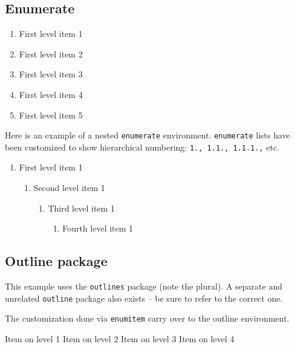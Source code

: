 \subsection{Enumerate}

    \begin{enumerate}
        \item First level item 1
        \item First level item 2
        \item First level item 3
        \item First level item 4
        \item First level item 5
    \end{enumerate}

    Here is an example of a nested \verb|enumerate| environment.
    \texttt{enumerate} lists have been customized to show hierarchical numbering:
    \texttt{1., 1.1., 1.1.1.,} etc.

    \begin{enumerate}
        \item First level item 1
        \begin{enumerate}
            \item Second level item 1
            \begin{enumerate}
                \item Third level item 1
                \begin{enumerate}
                    \item Fourth level item 1
                \end{enumerate}
            \end{enumerate}
        \end{enumerate}
    \end{enumerate}

\subsection{Outline package}

This example uses the \texttt{outlines} package (note the plural). A separate and unrelated \texttt{outline} package also exists -- be sure to refer to the correct one.

The customization done via \texttt{enumitem} carry over to the outline environment.

    \begin{outline}
        \1 Item on level 1
        \2 Item on level 2
        \3 Item on level 3
        \4 Item on level 4
    \end{outline}

